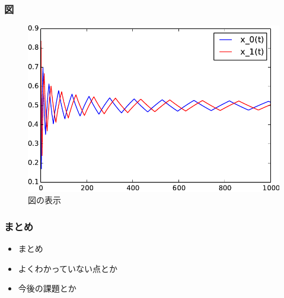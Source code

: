 \documentclass[dvipdfmx,fleqn]{beamer}
\begin{document}
\begin{frame}
\frametitle{図}
\begin{figure}
 \centering
 \includegraphics[width=\linewidth]{oneplay2.pdf}
 \caption{図の表示}
 \label{fig:matchingpennies_plot}
\end{figure}
\end{frame}



\begin{frame}
\frametitle{まとめ}
\begin{itemize}\setlength{\parskip}{0.5em}
\item
まとめ

\item
よくわかっていない点とか

\item
今後の課題とか
\end{itemize}
\end{frame}
\end{document}
